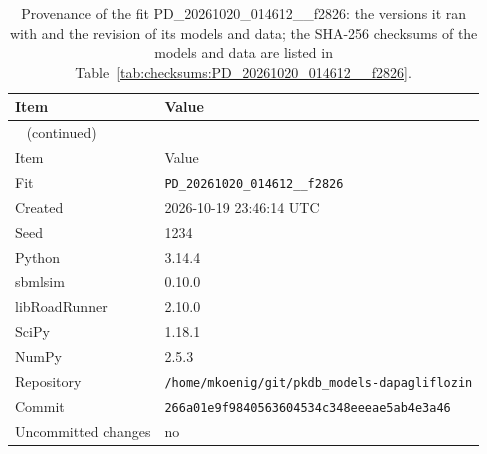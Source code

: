 \begin{longtable}{ll}
\caption{Provenance of the fit PD\_20261020\_014612\_\_f2826: the versions it ran with and the revision of its models and data; the SHA-256 checksums of the models and data are listed in Table~\ref{tab:checksums:PD_20261020_014612__f2826}.}\label{tab:provenance:PD_20261020_014612__f2826} \\
\toprule
Item & Value \\
\midrule
\endfirsthead
\multicolumn{2}{l}{\small\tablename~\thetable{} (continued)} \\
\toprule
Item & Value \\
\midrule
\endhead
\bottomrule
\endlastfoot
Fit & \texttt{PD\_20261020\_014612\_\_f2826} \\
Created & 2026-10-19 23:46:14 UTC \\
Seed & 1234 \\
Python & 3.14.4 \\
sbmlsim & 0.10.0 \\
libRoadRunner & 2.10.0 \\
SciPy & 1.18.1 \\
NumPy & 2.5.3 \\
Repository & \texttt{/home/mkoenig/git/pkdb\_models-dapagliflozin} \\
Commit & \texttt{266a01e9f9840563604534c348eeeae5ab4e3a46} \\
Uncommitted changes & no \\
\end{longtable}



